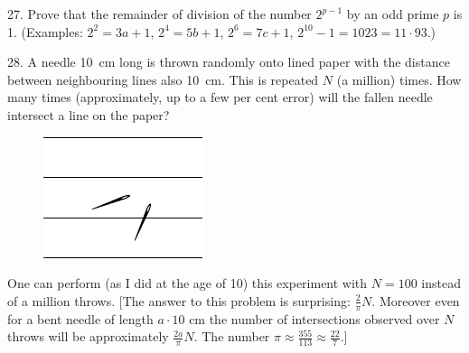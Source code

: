 \begin{problem}{27.}
	Prove that the remainder of division of the number $2^{p-1}$ by an odd prime $p$ is 1.
	(Examples: $2^2 = 3a +1$, $2^4 = 5b+1$, $2^6 = 7c+1$, $2^{10} - 1 = 1023 = 11\cdot 93$.)  
\end{problem}

\begin{problem}{28.}
	A needle \SI{10}{\cm} long is thrown randomly onto lined paper with the distance between neighbouring
	lines also \SI{10}{\cm}. This is repeated
	$N$ (a million) times. 
	How many times (approximately, up to a few per
	cent error) will the fallen needle intersect a line on the paper?
	\begin{figure}
		\includegraphics[scale=1]{taskbook-12}
	\end{figure}
	One can perform (as I did at the age of 10) this experiment with $N=100$ instead of a million throws.
	[The answer to this problem is surprising: $\frac2{\pi}N$. Moreover even for a bent needle of length $a \cdot 10$
	cm the number of intersections observed over $N$ throws will be approximately $\frac{2a}{\pi}N$. 
	The number $\pi \approx  \frac{355}{113} \approx \frac{22}7.$]
\end{problem}

